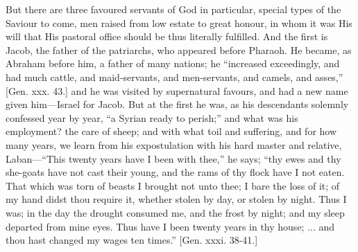 But there are three favoured servants of God in particular, special
types of the Saviour to come, men raised from low estate to great
honour, in whom it was His will that His pastoral office should be
thus literally fulfilled. And the first is Jacob, the father of the
patriarchs, who appeared before Pharaoh. He became, as Abraham before
him, a father of many nations; he ``increased exceedingly, and had much
cattle, and maid-servants, and men-servants, and camels, and
asses,'' [Gen. xxx. 43.] and he was visited by supernatural
favours, and had a new name given him—Israel for Jacob. But at the
first he was, as his descendants solemnly confessed year by year,
``a Syrian ready to perish;'' and what was his employment? the
care of sheep; and with what toil and suffering, and for how many
years, we learn from his expostulation with his hard master and
relative, Laban—``This twenty years have I been with
thee,'' he says; ``thy ewes and thy she-goats have not cast
their young, and the rams of thy flock have I not eaten. That which
was torn of beasts I brought not unto thee; I bare the loss of it; of
my hand didst thou require it, whether stolen by day, or stolen by
night. Thus I was; in the day the drought consumed me, and the frost
by night; and my sleep departed from mine eyes. Thus have I been
twenty years in thy house; ... and thou hast changed my wages ten
times.'' [Gen. xxxi. 38-41.]

